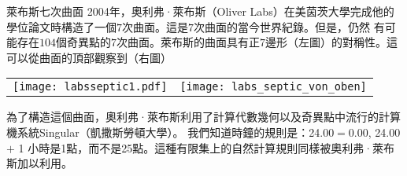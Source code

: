 \begin{surferPage}[萊布斯七次曲面]{萊布斯七次曲面}
2004年，奧利弗·萊布斯（Oliver Labs）在美茵茨大學完成他的學位論文時構造了一個$7$次曲面。這是$7$次曲面的當今世界紀錄。但是，仍然
有可能存在$104$個奇異點的$7$次曲面。萊布斯的曲面具有正$7$邊形（左圖）的對稱性。這可以從曲面的頂部觀察到（右圖）

    \vspace*{-0.3em}
    \begin{center}
      \begin{tabular}{c@{\qquad}c}
        \texttt{[image: labsseptic1.pdf]}
        &
        \texttt{[image: labs\_septic\_von\_oben]}
      \end{tabular}
    \end{center}
    \vspace*{-0.3em}

為了構造這個曲面，奧利弗·萊布斯利用了計算代數幾何以及奇異點中流行的計算機系統{\sc Singular}（凱撒斯勞頓大學）。
我們知道時鐘的規則是：24.00$=$0.00, 24.00 $+$ 1 小時是1點，而不是25點。這種有限集上的自然計算規則同樣被奧利弗·萊布斯加以利用。
\end{surferPage}

